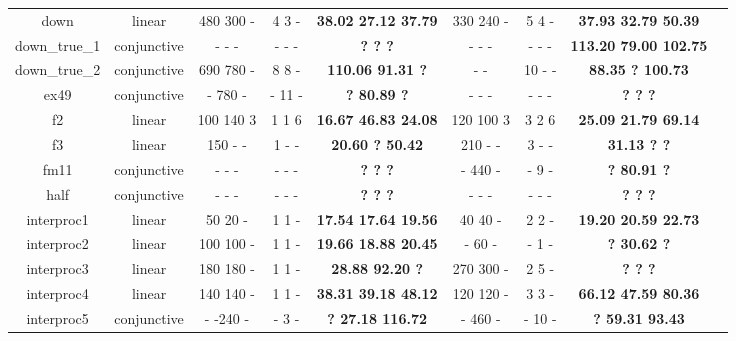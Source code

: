 \begin{table}[t]
\begin{tabular}{l c | c c c | c c c | c }
\multicolumn{1}{|c|}{down}				&linear 			&480 300 - &4 3 -&\textbf{38.02 27.12 37.79}	&330 240 - &5 4 -  &\textbf{37.93 32.79 50.39}		&\multicolumn{1}{|c|}{\cmark} \\
\multicolumn{1}{|c|}{down\_true\_1}		&conjunctive		&- - - &- - -&\textbf{? ? ?}				&- - - &- - -  &\textbf{113.20 79.00 102.75}	&\multicolumn{1}{|c|}{\cmark} \\
\multicolumn{1}{|c|}{down\_true\_2}		&conjunctive		&690 780 - &8 8 -&\textbf{110.06 91.31 ?}	& - - &10 - -  &\textbf{88.35 ? 100.73}		&\multicolumn{1}{|c|}{\cmark} \\
\multicolumn{1}{|c|}{ex49}				&conjunctive		&- 780 - &- 11 -&\textbf{? 80.89 ?}			&- - - &- - -  &\textbf{? ? ?}					&\multicolumn{1}{|c|}{\cmark} \\

\multicolumn{1}{|c|}{f2}				&linear 			&100 140 3 &1 1 6 &\textbf{16.67 46.83 24.08}	&120 100 3 &3 2 6   &\textbf{25.09 21.79 69.14}		&\multicolumn{1}{|c|}{\cmark} \\
\multicolumn{1}{|c|}{f3}				&linear 			&150 - - &1 - -&\textbf{20.60 ? 50.42}		&210 - - &3 - -  &\textbf{31.13 ? ?}				&\multicolumn{1}{|c|}{\cmark} \\
\multicolumn{1}{|c|}{fm11}				&conjunctive		&- - - &- - -&\textbf{? ? ?}				&- 440 - &- 9 -  &\textbf{? 80.91 ?}				&\multicolumn{1}{|c|}{\cmark} \\
\multicolumn{1}{|c|}{half}				&conjunctive		&- - - &- - -&\textbf{? ? ?}				&- - - &- - -  &\textbf{? ? ?}					&\multicolumn{1}{|c|}{\cmark} \\

\multicolumn{1}{|c|}{interproc1}		&linear 			&50 20 - &1 1 -&\textbf{17.54 17.64 19.56}	&40 40 - &2 2 -  &\textbf{19.20 20.59 22.73}		&\multicolumn{1}{|c|}{\cmark} \\
\multicolumn{1}{|c|}{interproc2}		&linear 			&100 100 - &1 1 -&\textbf{19.66 18.88 20.45}	&- 60 - &- 1 -  &\textbf{? 30.62 ?}				&\multicolumn{1}{|c|}{\cmark} \\
\multicolumn{1}{|c|}{interproc3}		&linear 			&180 180 - &1 1 -&\textbf{28.88 92.20 ?}		&270 300 - &2 5 -  &\textbf{? ? ?}					&\multicolumn{1}{|c|}{\cmark} \\
\multicolumn{1}{|c|}{interproc4}		&linear 			&140 140 - &1 1 -&\textbf{38.31 39.18 48.12}	&120 120 - &3 3 -  &\textbf{66.12 47.59 80.36}		&\multicolumn{1}{|c|}{\cmark} \\
\multicolumn{1}{|c|}{interproc5}		&conjunctive		&- -240 - &- 3 -&\textbf{? 27.18 116.72}		&- 460 - &- 10 -  &\textbf{? 59.31 93.43}			&\multicolumn{1}{|c|}{\cmark} \\


\end{tabular}
\end{table}
